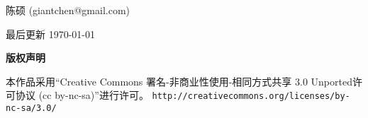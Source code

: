 \thispagestyle{plain}
\begin{center}
  {\LARGE\textbf{\BookTitle}}

  \vspace{1em}
  {\large 陈硕 (giantchen@gmail.com)}

  \vspace{1ex}
  最后更新 \today

  \vspace{1em}
  \textbf{\large 版权声明}
\end{center}
\noindent 本作品采用“Creative Commons 署名-非商业性使用-相同方式共享 3.0 Unported许可协议 
(cc by-nc-sa)”进行许可。
\texttt{\small http://creativecommons.org/licenses/by-nc-sa/3.0/}

\vspace{1em}

